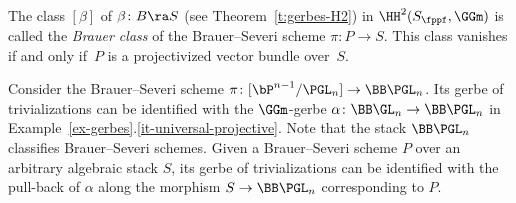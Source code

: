 The class $[\beta]$ of $\beta \colon B \ra S$ (see Theorem~\ref{t:gerbes-H2}) in $\HH^2(S_\fppf, \GGm)$
is called the \emph{Brauer class} of the Brauer--Severi scheme $\pi\colon P \to S$.
This class vanishes if and only if~$P$
is a projectivized vector bundle over~$S$.

\begin{remark}
\label{rem-universal-gerbe-of-trivializations}
Consider the Brauer--Severi scheme $\pi\colon [\bP^{n - 1}/\PGL_n] \to \BB \PGL_n$.
Its gerbe of trivializations can be identified with the $\GGm$-gerbe
$\alpha \colon \BB \GL_n \to \BB \PGL_n$
in Example~\ref{ex-gerbes}.\ref{it-universal-projective}.
Note that the stack $\BB \PGL_n$ classifies Brauer--Severi schemes.
Given a Brauer--Severi scheme $P$ over an arbitrary algebraic stack $S$,
its gerbe of trivializations can be identified with the pull-back of $\alpha$
along the morphism $S \to \BB \PGL_n$ corresponding to $P$.
\end{remark}

